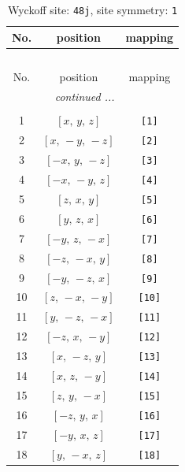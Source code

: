 \documentclass[fleqn,8pt]{jsarticle}
\begin{document}
\begin{longtable}{ccc}
\caption{Wyckoff site: {\tt 48j}, site symmetry: {\tt 1}}
 \\
 \hline \hline
No. & position & mapping \\ \hline \endfirsthead

\multicolumn{2}{l}{\tablename\ \thetable{}} \\
 \hline \hline
No. & position & mapping \\ \hline \endhead

 \hline \hline
\multicolumn{2}{r}{\footnotesize\it continued ...} \\ \endfoot

 \hline \hline
\multicolumn{2}{r}{} \\ \endlastfoot

1 & $\left[ x,\, y,\, z \right]$ & {\tt [1]} \\ \hline
2 & $\left[ x,\, - y,\, - z \right]$ & {\tt [2]} \\ \hline
3 & $\left[ - x,\, y,\, - z \right]$ & {\tt [3]} \\ \hline
4 & $\left[ - x,\, - y,\, z \right]$ & {\tt [4]} \\ \hline
5 & $\left[ z,\, x,\, y \right]$ & {\tt [5]} \\ \hline
6 & $\left[ y,\, z,\, x \right]$ & {\tt [6]} \\ \hline
7 & $\left[ - y,\, z,\, - x \right]$ & {\tt [7]} \\ \hline
8 & $\left[ - z,\, - x,\, y \right]$ & {\tt [8]} \\ \hline
9 & $\left[ - y,\, - z,\, x \right]$ & {\tt [9]} \\ \hline
10 & $\left[ z,\, - x,\, - y \right]$ & {\tt [10]} \\ \hline
11 & $\left[ y,\, - z,\, - x \right]$ & {\tt [11]} \\ \hline
12 & $\left[ - z,\, x,\, - y \right]$ & {\tt [12]} \\ \hline
13 & $\left[ x,\, - z,\, y \right]$ & {\tt [13]} \\ \hline
14 & $\left[ x,\, z,\, - y \right]$ & {\tt [14]} \\ \hline
15 & $\left[ z,\, y,\, - x \right]$ & {\tt [15]} \\ \hline
16 & $\left[ - z,\, y,\, x \right]$ & {\tt [16]} \\ \hline
17 & $\left[ - y,\, x,\, z \right]$ & {\tt [17]} \\ \hline
18 & $\left[ y,\, - x,\, z \right]$ & {\tt [18]} \\ \hline

\end{longtable}
\end{document}

